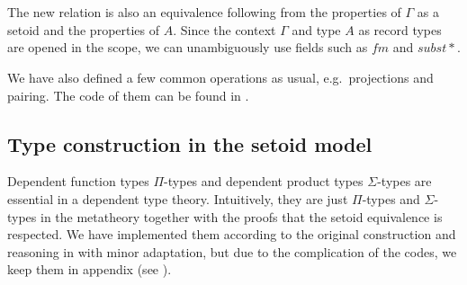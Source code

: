 \begin{code}
\\
\>[0]\<[19]%
\>[19]\AgdaFunction{[}  \AgdaSymbol{\_} \AgdaFunction{]trans} \AgdaSymbol{(}\AgdaFunction{[}  \AgdaSymbol{\_} \AgdaFunction{]trans} \<[48]%
\>[48]\<%
\\
\>[0]\<[19]%
\>[19]\AgdaSymbol{(}\AgdaFunction{[}  \AgdaSymbol{\_} \AgdaFunction{]sym} \AgdaSymbol{(} \AgdaSymbol{\_))} \AgdaSymbol{(} \AgdaSymbol{\_} \AgdaSymbol{))} \AgdaSymbol{\}}\<%
\\
\>[0]\<[9]%
\>[9]\AgdaSymbol{\}}\<%
\\
\>[0]\<[4]%
\>[4]\<%
\\
\>[4]\<[6]%
\>[6]  \<%
\\
\>[4]\<[6]%
\>[6]  \<%
\\
\end{code}

The new relation is also an equivalence following from the properties of $\Gamma$ as a setoid and the properties of $A$.
Since the context $\Gamma$ and type $A$ as record types are opened in the scope, we can unambiguously use fields such as $fm$ and $subst*$.

We have also defined a few common operations as usual, e.g.\ projections and pairing. The code of them can be found in .

\subsection{Type construction in the setoid model}

Dependent function types $\Pi$-types and dependent product types $\Sigma$-types are essential in a dependent type theory. Intuitively, they are just $\Pi$-types and $\Sigma$-types in the metatheory together with the proofs that the setoid equivalence is respected. We have implemented them according to the original construction and reasoning in \cite{alti:lics99} with minor adaptation, but due to the complication of the codes, we keep them in appendix (see ).


